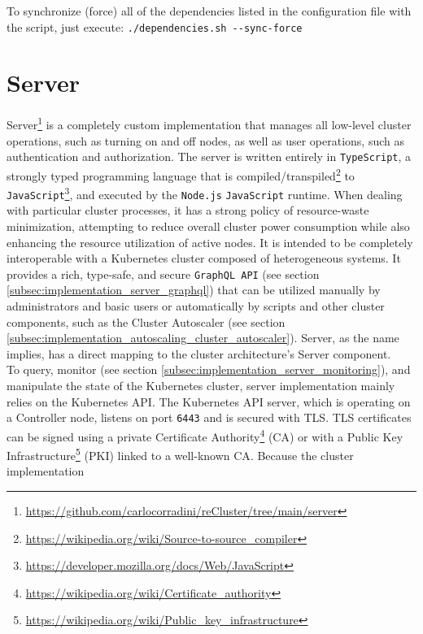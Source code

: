 To synchronize (force) all of the dependencies listed in the configuration file
with the script, just execute: \lstinline[language=shell, alsoletter={.-},
morekeywords={[2]{dependencies.sh}}, morekeywords={[3]{--sync-force}}]{./dependencies.sh --sync-force}

\section{Server}
\label{sec:implementation_server}

Server\footnote{\url{https://github.com/carlocorradini/reCluster/tree/main/server}}
is a completely custom implementation that manages all low-level cluster operations,
such as turning on and off nodes, as well as user operations, such as
authentication and authorization. The server is written entirely in \texttt{TypeScript},
a strongly typed programming language that is compiled/transpiled\footnote{\url{https://wikipedia.org/wiki/Source-to-source_compiler}}
to \texttt{JavaScript}\footnote{\url{https://developer.mozilla.org/docs/Web/JavaScript}}\cite{typescript},
and executed by the \texttt{Node.js} \texttt{JavaScript} runtime\cite{nodejs}.
When dealing with particular cluster processes, it has a strong policy of resource-waste
minimization, attempting to reduce overall cluster power consumption while also
enhancing the resource utilization of active nodes. It is intended to be completely
interoperable with a Kubernetes cluster composed of heterogeneous systems. It
provides a rich, type-safe, and secure \texttt{GraphQL API} (see section
\ref{subsec:implementation_server_graphql}) that can be utilized manually by administrators
and basic users or automatically by scripts and other cluster components, such
as the Cluster Autoscaler (see section \ref{subsec:implementation_autoscaling_cluster_autoscaler}).
Server, as the name implies, has a direct mapping to the cluster architecture's Server
component. \\ %
To query, monitor (see section \ref{subsec:implementation_server_monitoring}), and
manipulate the state of the Kubernetes cluster, server implementation mainly
relies on the Kubernetes API. The Kubernetes API server, which is operating on a
Controller node, listens on port \texttt{6443} and is secured with TLS. TLS certificates
can be signed using a private Certificate Authority\footnote{\url{https://wikipedia.org/wiki/Certificate_authority}}
(CA) or with a Public Key Infrastructure\footnote{\url{https://wikipedia.org/wiki/Public_key_infrastructure}}
(PKI) linked to a well-known CA\cite{k8s_api_access}. Because the cluster implementation
